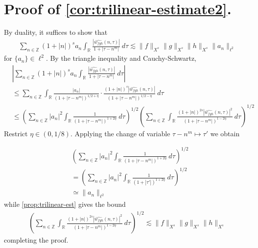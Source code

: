 \documentclass[12pt,reqno]{amsart}
\numberwithin{equation}{section}  %
\numberwithin{figure}{section}
\newcommand{\rr}{\mathbb{R}}
\newcommand{\zz}{\mathbb{Z}}
\newcommand{\wh}{\widehat}
\theoremstyle{plain}
\theoremstyle{definition}
\theoremstyle{remark}
\begin{document}
\section{Proof of \autoref{cor:trilinear-estimate2}.}
By duality, it suffices to show that 
%
\begin{equation*}
	\begin{split}
		\sum_{n \in \zz} \left (1 + |n| \right )^{s}
		a_n \int_{\rr} \frac{|\wh{w_{fgh}}(n, \tau)|}{1 
		+ | \tau - n^{m } |} \ d \tau \lesssim \|f\|_{X^s} \|g\|_{X^s} \|h\|_{X^s}
		\|a_n \|_{\ell^2}
	\end{split}
\end{equation*}
%
for $\{a_n\} \in \ell^2$. By the triangle inequality 
and Cauchy-Schwartz,
%
\begin{equation}
	\label{1m}
	\begin{split}
		& | \sum_{n \in \zz} \left (1 + |n| \right )^{s} a_n
		\int_{\rr}\frac{| \wh{w_{fgh}}(n, \tau) |}{1 + | \tau - n^{m } |} \ d \tau |
		\\
		& \le \sum_{n \in \zz} \int_{\rr} \frac{| a_n |}{\left( 1 + 
		| \tau - n^{m } |
		\right)^{1/2 + \eta}} \cdot \frac{\left( 1 + | n| \right)^s  |
		\wh{w_{fgh}}(n, \tau) |}{\left( 
		1 + | \tau - n^{m } | \right)^{1/2 - \eta}} \ d \tau
		\\
		& \le \left( \sum_{n \in \zz} | a_{n} |^2\int_{\rr} \frac{1}{\left( 1 + | \tau - n^{m } | \right)^{1 + 2 \eta}} \ d \tau  
		\right)^{1/2} 
		\left ( \sum_{n \in \zz}\int_{\rr} \frac{\left (1 + |n| \right )^{2s} | \wh{w_{fgh}}(n, \tau) 
		|^2}{\left( 1 + | \tau - n^{m } | \right)^{1 - 2 \eta}}\ d \tau 
		\right)^{1/2}
	\end{split}
\end{equation}
%
Restrict $\eta \in (0, 1/8)$. Applying the change of variable $\tau - n^{m }
\mapsto \tau'$ we obtain  %

\begin{equation*}
	\begin{split}
		& \left( \sum_{n \in \zz} | a_{n} |^2\int_{\rr} \frac{1}{\left( 1 + | \tau -
		n^{m } | \right)^{1 + 2 \eta}} \ d \tau  
		\right)^{1/2} 
		\\
		& = \left ( \sum_{n \in \zz}
		| a_n |^2 
		\int_{\rr} \frac{1}{\left( 1 + | \tau' | \right)^{1 + 2 \eta}} \ d 
		\tau \right)^{1/2}
		\\
		& \simeq \|a_n\|_{\ell^2}
		\end{split}
\end{equation*}
while \autoref{prop:trilinear-est} gives the bound
\begin{equation*}
	\begin{split}
		\left ( \sum_{n \in \zz}\int_{\rr} \frac{\left (1 + |n| \right )^{2s} | \wh{w_{fgh}}(n, \tau) 
		|^2}{\left( 1 + | \tau - n^{m } | \right)^{1 - 2 \eta}}\ d \tau 
		\right)^{1/2} \lesssim \|f\|_{X^s} \|g\|_{X^s} \|h\|_{X^s}
	\end{split}
\end{equation*}
%
completing the proof.
\qquad \qedsymbol
%
%
%
\end{document}
